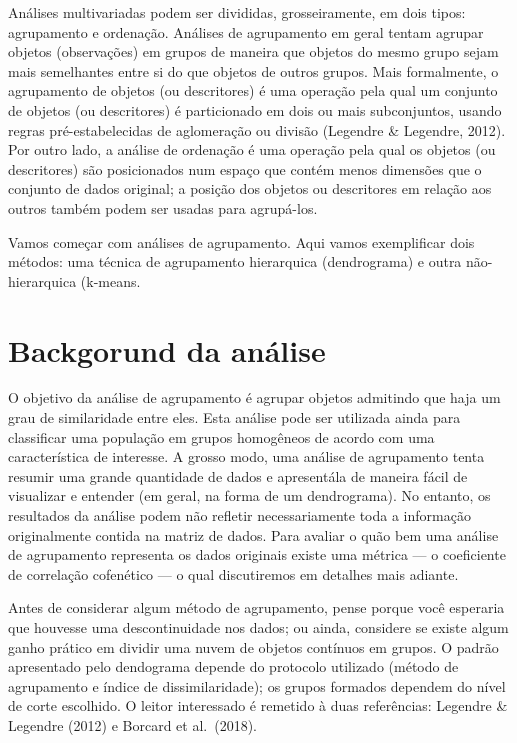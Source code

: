 \documentclass[
]{book}
\begin{document}
Análises multivariadas podem ser divididas, grosseiramente, em dois tipos: agrupamento e ordenação. Análises de agrupamento em geral tentam agrupar objetos (observações) em grupos de maneira que objetos do mesmo grupo sejam mais semelhantes entre si do que objetos de outros grupos. Mais formalmente, o agrupamento de objetos (ou descritores) é uma operação pela qual um conjunto de objetos (ou descritores) é particionado em dois ou mais subconjuntos, usando regras pré-estabelecidas de aglomeração ou divisão (Legendre \& Legendre, 2012). Por outro lado, a análise de ordenação é uma operação pela qual os objetos (ou descritores) são posicionados num espaço que contém menos dimensões que o conjunto de dados original; a posição dos objetos ou descritores em relação aos outros também podem ser usadas para agrupá-los.

Vamos começar com análises de agrupamento. Aqui vamos exemplificar dois métodos: uma técnica de agrupamento hierarquica (dendrograma) e outra não-hierarquica (k-means.

\hypertarget{backgorund-da-anuxe1lise}{%
\section{Backgorund da análise}\label{backgorund-da-anuxe1lise}}

O objetivo da análise de agrupamento é agrupar objetos admitindo que haja um grau de similaridade entre eles. Esta análise pode ser utilizada ainda para classificar uma população em grupos homogêneos de acordo com uma característica de interesse. A grosso modo, uma análise de agrupamento tenta resumir uma grande quantidade de dados e apresentála de maneira fácil de visualizar e entender (em geral, na forma de um dendrograma). No entanto, os resultados da análise podem não refletir necessariamente toda a informação originalmente contida na matriz de dados. Para avaliar o quão bem uma análise de agrupamento representa os dados originais existe uma métrica --- o coeficiente de correlação cofenético --- o qual discutiremos em detalhes mais adiante.

Antes de considerar algum método de agrupamento, pense porque você esperaria que houvesse uma descontinuidade nos dados; ou ainda, considere se existe algum ganho prático em dividir uma nuvem de objetos contínuos em grupos. O padrão apresentado pelo dendograma depende do protocolo utilizado (método de agrupamento e índice de dissimilaridade); os grupos formados dependem do nível de corte escolhido. O leitor interessado é remetido à duas referências: Legendre \& Legendre (2012) e Borcard et al.~(2018).
\end{document}
